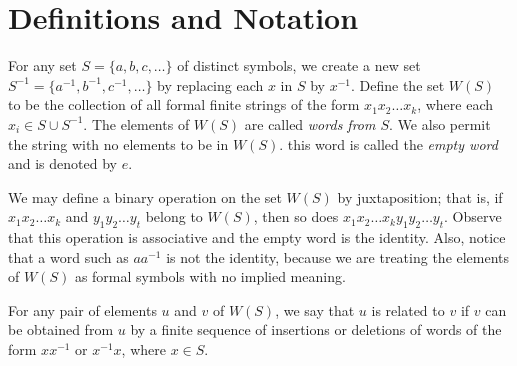\section{Definitions and Notation}

\begin{remark}
	For any set $S=\{a,b,c,\dots\}$ of distinct symbols, we create a new set $S^{-1} = \{a^{-1},b^{-1},c^{-1},\dots\}$ by replacing each $x$ in $S$ by $x^{-1}$. Define the set $W(S)$ to be the collection of all formal finite strings of the form $x_1x_2\dots x_k$, where each $x_i \in S \cup S^{-1}$. The elements of $W(S)$ are called \textit{words from $S$}. We also permit the string with no elements to be in $W(S)$. this word is called the \textit{empty word} and is denoted by $e$.

	We may define a binary operation on the set $W(S)$ by juxtaposition; that is, if $x_1x_2\dots x_k$ and $y_1y_2\dots y_t$ belong to $W(S)$, then so does $x_1x_2\dots x_ky_1y_2\dots y_t$. Observe that this operation is associative and the empty word is the identity. Also, notice that a word such as $aa^{-1}$ is not the identity, because we are treating the elements of $W(S)$ as formal symbols with no implied meaning.
\end{remark}

\begin{definition}
	For any pair of elements $u$ and $v$ of $W(S)$, we say that $u$ is related to $v$ if $v$ can be obtained from $u$ by a finite sequence of insertions or deletions of words of the form $xx^{-1}$ or $x^{-1}x$, where $x \in S$.
\end{definition}
